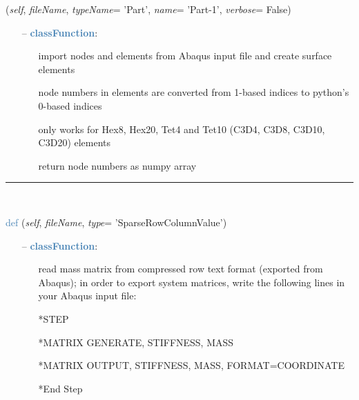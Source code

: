 \begin{itemize}[leftmargin=1.4cm]
\begin{itemize}[leftmargin=1.4cm]
\begin{itemize}[leftmargin=0.5cm]
\begin{itemize}[leftmargin=1.4cm]
\begin{itemize}[leftmargin=1.4cm]
\begin{itemize}[leftmargin=0.5cm]
\begin{flushleft}
({\it self}, {\it fileName}, {\it typeName}= 'Part', {\it name}= 'Part-1', {\it verbose}= False)
\end{flushleft}
\setlength{\itemindent}{0.7cm}
\begin{itemize}[leftmargin=0.7cm]
\item[--]\textcolor{steelblue}{\bf classFunction}: \vspace{-6pt}
\begin{itemize}[leftmargin=1.2cm]
\setlength{\itemindent}{-0.7cm}
\item[]import nodes and elements from Abaqus input file and create surface elements
\item[]node numbers in elements are converted from 1-based indices to python's 0-based indices
\item[]only works for Hex8, Hex20, Tet4 and Tet10 (C3D4, C3D8, C3D10, C3D20) elements
\item[]return node numbers as numpy array
\end{itemize}
\vspace{12pt}\end{itemize}
%
\noindent\rule{8cm}{0.75pt}\vspace{1pt} \\ 
\begin{flushleft}
\noindent \textcolor{steelblue}{def {\bf {}}}\label{sec:FEM:FEMinterface:ReadMassMatrixFromAbaqus}
({\it self}, {\it fileName}, {\it type}= 'SparseRowColumnValue')
\end{flushleft}
\setlength{\itemindent}{0.7cm}
\begin{itemize}[leftmargin=0.7cm]
\item[--]\textcolor{steelblue}{\bf classFunction}: \vspace{-6pt}
\begin{itemize}[leftmargin=1.2cm]
\setlength{\itemindent}{-0.7cm}
\item[]read mass matrix from compressed row text format (exported from Abaqus); in order to export system matrices, write the following lines in your Abaqus input file:
\item[]*STEP
\item[]*MATRIX GENERATE, STIFFNESS, MASS
\item[]*MATRIX OUTPUT, STIFFNESS, MASS, FORMAT=COORDINATE
\item[]*End Step
\end{itemize}
\vspace{12pt}\end{itemize}

\end{itemize}
\end{itemize}
\end{itemize}
\end{itemize}
\end{itemize}
\end{itemize}
